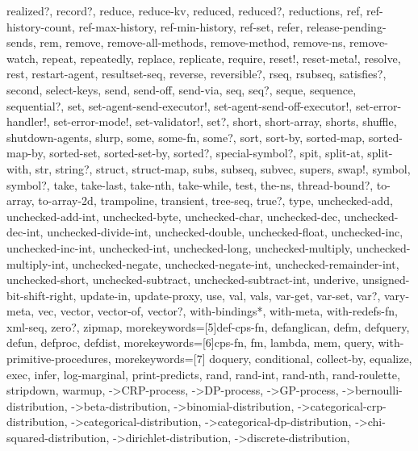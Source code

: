 {{    realized?, record?, reduce, reduce-kv, reduced, reduced?, reductions, ref, %
    ref-history-count, ref-max-history, ref-min-history, ref-set, refer, %
    release-pending-sends, rem, remove, remove-all-methods, remove-method, %
    remove-ns, remove-watch, repeat, repeatedly, replace, replicate, require, %
    reset!, reset-meta!, resolve, rest, restart-agent, resultset-seq, reverse, %
    reversible?, rseq, rsubseq, satisfies?, second, select-keys, send, send-off, %
    send-via, seq, seq?, seque, sequence, sequential?, set, %
    set-agent-send-executor!, set-agent-send-off-executor!, set-error-handler!, %
    set-error-mode!, set-validator!, set?, short, short-array, shorts, shuffle, %
    shutdown-agents, slurp, some, some-fn, some?, sort, sort-by, sorted-map, %
    sorted-map-by, sorted-set, sorted-set-by, sorted?, special-symbol?, spit, %
    split-at, split-with, str, string?, struct, struct-map, subs, subseq, %
    subvec, supers, swap!, symbol, symbol?, take, take-last, take-nth, %
    take-while, test, the-ns, thread-bound?, to-array, to-array-2d, trampoline, %
    transient, tree-seq, true?, type, unchecked-add, unchecked-add-int, %
    unchecked-byte, unchecked-char, unchecked-dec, unchecked-dec-int, %
    unchecked-divide-int, unchecked-double, unchecked-float, unchecked-inc, %
    unchecked-inc-int, unchecked-int, unchecked-long, unchecked-multiply, %
    unchecked-multiply-int, unchecked-negate, unchecked-negate-int, %
    unchecked-remainder-int, unchecked-short, unchecked-subtract, %
    unchecked-subtract-int, underive, unsigned-bit-shift-right, update-in, %
    update-proxy, use, val, vals, var-get, var-set, var?, vary-meta, vec, %
    vector, vector-of, vector?, with-bindings*, with-meta, with-redefs-fn, %
    xml-seq, zero?, zipmap}, %
  morekeywords=[5]{def-cps-fn, defanglican, defm, defquery, defun, defproc, defdist}, %
  morekeywords=[6]{cps-fn, fm, lambda, mem, query, with-primitive-procedures}, %
  morekeywords=[7]{%
    doquery, %
    conditional, %
    collect-by, equalize, exec, infer, log-marginal, print-predicts, %
    rand, rand-int, rand-nth, rand-roulette, stripdown, warmup, %
    ->CRP-process, ->DP-process, ->GP-process, %
    ->bernoulli-distribution, ->beta-distribution, ->binomial-distribution, %
    ->categorical-crp-distribution, ->categorical-distribution, %
    ->categorical-dp-distribution, ->chi-squared-distribution, %
    ->dirichlet-distribution, ->discrete-distribution, %
}}
